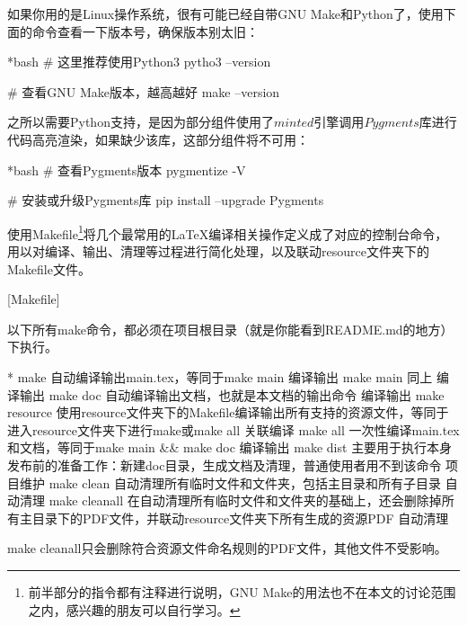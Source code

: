如果你用的是Linux操作系统，很有可能已经自带GNU Make和Python了，使用下面的命令查看一下版本号，确保版本别太旧：

\begin{dkcode}*{bash}
# 这里推荐使用Python3
pytho3 --version

# 查看GNU Make版本，越高越好
make --version
\end{dkcode}

之所以需要Python支持，是因为{\dk}部分组件使用了$minted$引擎调用$Pygments$库进行代码高亮渲染，如果缺少该库，这部分组件将不可用：

\begin{dkcode}*{bash}
# 查看Pygments版本
pygmentize -V

# 安装或升级Pygments库
pip install --upgrade Pygments
\end{dkcode}

{\dk}使用Makefile\footnote{前半部分的指令都有注释进行说明，GNU Make的用法也不在本文的讨论范围之内，感兴趣的朋友可以自行学习。}将几个最常用的{\LaTeX}编译相关操作定义成了对应的控制台命令，用以对编译、输出、清理等过程进行简化处理，以及联动resource文件夹下的Makefile文件。

[Makefile]

\begin{dkcomment}
  以下所有make命令，都必须在项目根目录（就是你能看到README.md的地方）下执行。
\end{dkcomment}

\begin{cvhonors}*
  \cvhonor
  {make}
  {自动编译输出main.tex，等同于make main}
  {编译输出}
  \cvhonor
  {make main}
  {同上}
  {编译输出}
  \cvhonor
  {make doc}
  {自动编译输出{\dk}文档，也就是本文档的输出命令}
  {编译输出}
  \cvhonor
  {make resource}
  {使用resource文件夹下的Makefile编译输出所有支持的资源文件，等同于进入resource文件夹下进行make或make all}
  {关联编译}
  \cvhonor
  {make all}
  {一次性编译main.tex和{\dk}文档，等同于make main \&\& make doc}
  {编译输出}
  \cvhonor
  {make dist}
  {主要用于执行{\dk}本身发布前的准备工作：新建doc目录，生成文档及清理，普通使用者用不到该命令}
  {项目维护}
  \cvhonor
  {make clean}
  {自动清理所有临时文件和文件夹，包括主目录和所有子目录}
  {自动清理}
  \cvhonor
  {make cleanall}
  {在自动清理所有临时文件和文件夹的基础上，还会删除掉所有主目录下的PDF文件，并联动resource文件夹下所有生成的资源PDF}
  {自动清理}
\end{cvhonors}

\begin{dkcomment}
  make cleanall只会删除符合资源文件命名规则的PDF文件，其他文件不受影响。
\end{dkcomment}

